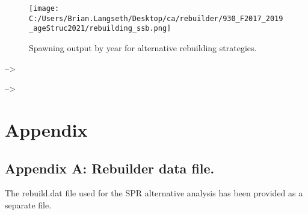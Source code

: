 \documentclass[11pt,
  english,
  a4paper,
]{article}
\begin{document}
\tagmcend\tagstructend


\begin{figure}
\centering
\texttt{[image: C:/Users/Brian.Langseth/Desktop/ca/rebuilder/930\_F2017\_2019\_ageStruc2021/rebuilding\_ssb.png]}
\caption{Spawning output by year for alternative rebuilding strategies.\label{fig:ssb-fig}}
\end{figure}

\tagmcend\tagstructend


--\textgreater{}

\leavevmode\tagmcend\tagstructend\par


--\textgreater{}

\leavevmode\tagmcend\tagstructend\par

\clearpage


\hypertarget{appendix}{%
\section{Appendix}\label{appendix}}

\leavevmode\tagmcend\tagstructend


\hypertarget{append_a}{%
\subsection{Appendix A: Rebuilder data file.}\label{append_a}}

\leavevmode\tagmcend\tagstructend


The rebuild.dat file used for the SPR alternative analysis has been provided as a separate file.

\leavevmode\tagmcend\tagstructend\par

\clearpage

\end{document}
